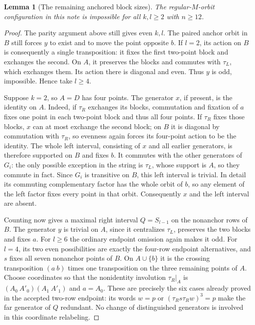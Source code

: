 \documentclass[11pt,a4paper]{article}
\newtheorem{lemma}{Lemma}
\begin{document}
\begin{lemma}[The remaining anchored block sizes]
The regular-$M$-orbit configuration in this note is
impossible for all $k,l\geq2$ with $n\geq12$.
\end{lemma}
\begin{proof}
The parity argument above still gives even $k,l$.
The paired anchor orbit in $B$ still forces $y$ to
exist and to move the point opposite $b$.
If $l=2$, its action on $B$ is consequently a single
transposition: it fixes the first two-point block and
exchanges the second. On $A$, it preserves the blocks
and commutes with $\tau_L$, which exchanges them.
Its action there is diagonal and even. Thus $y$ is odd,
impossible. Hence take $l\geq4$.

Suppose $k=2$, so $A=D$ has four points. The generator
$x$, if present, is the identity on $A$. Indeed, if
$\tau_R$ exchanges its blocks, commutation and fixation
of $a$ fixes one point in each two-point block and thus
all four points. If $\tau_R$ fixes those blocks, $x$
can at most exchange the second block; on $B$ it is
diagonal by commutation with $\tau_R$, so evenness again
forces its four-point action to be the identity.
The whole left interval, consisting of $x$ and all
earlier generators, is therefore supported on $B$ and
fixes $b$. It commutes with the other generators of
$G_i$: the only possible exception in the string is
$\tau_L$, whose support is $A$, so they commute in fact.
Since $G_i$ is transitive on $B$, this left interval
is trivial. In detail its commuting complementary
factor has the whole orbit of $b$, so any element of
the left factor fixes every point in that orbit.
Consequently $x$ and the left interval are absent.

Counting now gives a maximal right interval $Q=S_{l-1}$
on the nonanchor rows of $B$. The generator $y$ is
trivial on $A$, since it centralizes $\tau_L$, preserves
the two blocks and fixes $a$. For $l\geq6$ the ordinary
endpoint omission again makes it odd. For $l=4$, its
two even possibilities are exactly the four-row
endpoint alternatives, and $s$ fixes all seven
nonanchor points of $B$. On $A\cup\{b\}$ it is the
crossing transposition $(a\ b)$ times one transposition
on the three remaining points of $A$. Choose coordinates
so that the nonidentity involution $\tau_R|_A$ is
$(A_0\ A'_0)(A_1\ A'_1)$ and $a=A_0$.
These are precisely the six cases already proved in
the accepted two-row endpoint: its words $w=p$ or
$(\tau_R s\tau_R w)^3=p$ make the far generator of
$Q$ redundant. No change of distinguished generators
is involved in this coordinate relabeling.


\end{proof}
\end{document}
